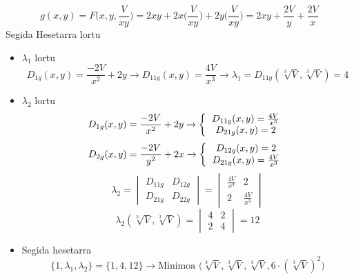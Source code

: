 \newpage
\begin{equation*}
    \boxed{g(x,y) = F\Bigg(x,y,\frac{V}{xy}\Bigg)} = 2xy + 2x\Bigg(\frac{V}{xy}\Bigg) + 2y\Bigg(\frac{V}{xy}\Bigg)= 2xy + \frac{2V}{y} + \frac{2V}{x}
\end{equation*}
Segida Hesetarra lortu
\begin{itemize}
    \item $\lambda_1$ lortu
        \begin{equation*}
        D_{1g}(x,y) = \frac{-2V}{x^2} + 2y
        \rightarrow
        D_{11g}(x,y) = \frac{4V}{x^3}
        \rightarrow
        \lambda_{1} = D_{11g}(\sqrt[3]{V}, \sqrt[3]{V}) = 4
        \end{equation*}
\item $\lambda_2$ lortu
    \begin{equation*}
        D_{1g}(x,y) = \frac{-2V}{x^2} + 2y
        \rightarrow
        \left\{
        \begin{tabular}{c}
        $D_{11g}(x,y) = \frac{4V}{x^3}$ \\
        $D_{21g}(x,y) = 2$
        \end{tabular}
        \right.
    \end{equation*}
    \begin{equation*}
        D_{2g}(x,y) = \frac{-2V}{y^2} + 2x
        \rightarrow
        \left\{
        \begin{tabular}{c}
        $D_{12g}(x,y) = 2$ \\
        $D_{21g}(x,y) = \frac{4V}{x^3}$
        \end{tabular}
        \right.
    \end{equation*}
    \begin{equation*}
        \lambda_{2} = 
    \begin{vmatrix}
        D_{11g} & D_{12g}\\
        D_{21g} & D_{22g}
    \end{vmatrix}
    =
    \begin{vmatrix}
        \frac{4V}{x^3} & 2\\
        2 & \frac{4V}{x^3}
    \end{vmatrix}
    \end{equation*}
    \begin{equation*}
        \lambda_{2}(\sqrt[3]{V},\sqrt[3]{V}) = 
    \begin{vmatrix}
        4 & 2\\
        2 & 4
    \end{vmatrix}
    = 12
    \end{equation*}
\item Segida hesetarra
    \begin{equation*}
    \{1, \lambda_{1}, \lambda_{2}\} = \{1, 4, 12\}
    \rightarrow
    \boxed{\text{Minimoa }\Big(\sqrt[3]{V}, \sqrt[3]{V}, \sqrt[3]{V}, 6\cdot(\sqrt[3]{V})^2\Big)}
    \end{equation*}
\end{itemize}





